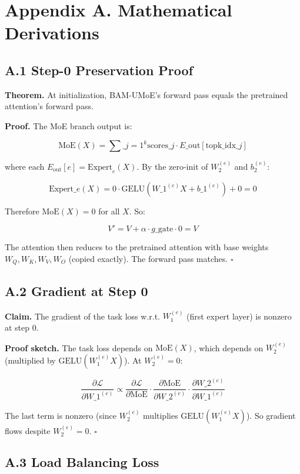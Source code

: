 \section{Appendix A. Mathematical Derivations}

\subsection{A.1 Step-0 Preservation Proof}

\textbf{Theorem.} At initialization, BAM-UMoE's forward pass equals the pretrained 
attention's forward pass.

\textbf{Proof.} The MoE branch output is:

\[
\text{MoE}(X) = \sum\_{j=1}^{k} \text{scores}\_j \cdot E\_{\text{out}}[\text{topk\_idx}\_j]
\]

where each $E_\text{out}[e] = \text{Expert}_e(X)$. By the zero-init of 
$W_2^{(e)}$ and $b_2^{(e)}$:

\[
\text{Expert}\_e(X) = 0 \cdot \text{GELU}(W\_1^{(e)} X + b\_1^{(e)}) + 0 = 0
\]

Therefore $\text{MoE}(X) = 0$ for all $X$. So:

\[
V' = V + \alpha \cdot g\_\text{gate} \cdot 0 = V
\]

The attention then reduces to the pretrained attention with base weights 
$W_Q, W_K, W_V, W_O$ (copied exactly). The forward pass matches. $\square$

\subsection{A.2 Gradient at Step 0}

\textbf{Claim.} The gradient of the task loss w.r.t. $W_1^{(e)}$ (first expert 
layer) is nonzero at step 0.

\textbf{Proof sketch.} The task loss depends on $\text{MoE}(X)$, which depends 
on $W_2^{(e)}$ (multiplied by $\text{GELU}(W_1^{(e)} X)$). At $W_2^{(e)} = 0$:

\[
\frac{\partial \mathcal{L}}{\partial W\_1^{(e)}} \propto \frac{\partial \mathcal{L}}{\partial \text{MoE}} \cdot \frac{\partial \text{MoE}}{\partial W\_2^{(e)}} \cdot \frac{\partial W\_2^{(e)}}{\partial W\_1^{(e)}}
\]

The last term is nonzero (since $W_2^{(e)}$ multiplies $\text{GELU}(W_1^{(e)} X)$). 
So gradient flows despite $W_2^{(e)} = 0$. $\square$

\subsection{A.3 Load Balancing Loss}

